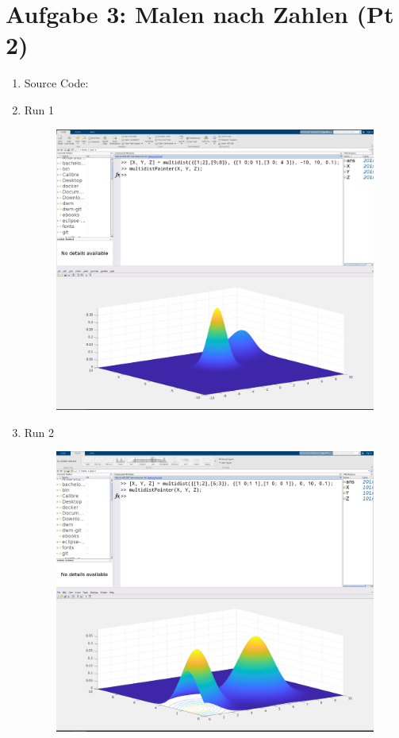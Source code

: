 \documentclass[12pt,a4paper]{article}
\begin{document}
\section*{Aufgabe 3: Malen nach Zahlen (Pt 2)}
\begin{enumerate}[leftmargin=!,labelindent=5pt]
	\item Source Code:
		
		

	\item Run 1
		\begin{figure}[H]
			\centering
			\includegraphics[scale=0.2]{./img/multidist_01.png}\label{fig:1}
		\end{figure}

	\item Run 2
		\begin{figure}[H]
			\centering
			\includegraphics[scale=0.2]{./img/multidist_02.png}\label{fig:1}
		\end{figure}
\end{enumerate}
\end{document}
